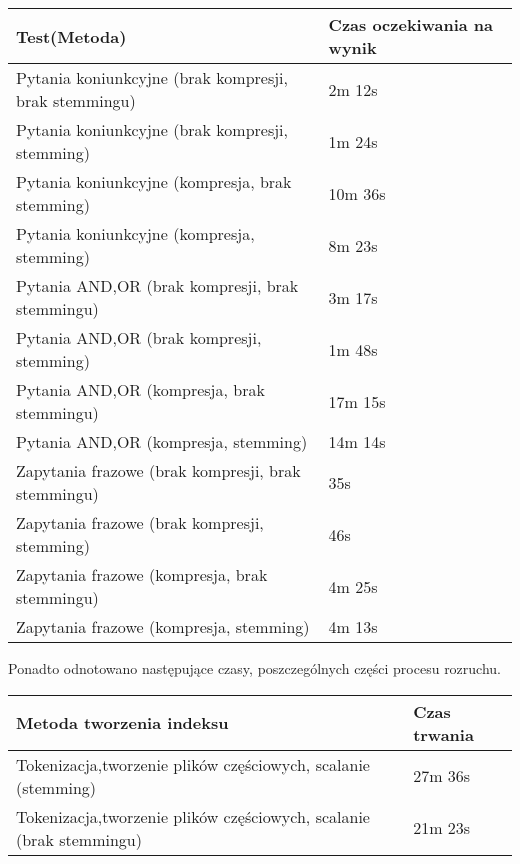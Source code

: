 \documentclass[11pt,leqno]{article}
\begin{document}
\begin{tabular}{|l|l|}
\hline
Test(Metoda) & Czas oczekiwania na wynik\\
\hline
Pytania koniunkcyjne (brak kompresji, brak stemmingu) & 2m 12s\\
Pytania koniunkcyjne (brak kompresji, stemming) & 1m 24s\\
Pytania koniunkcyjne (kompresja, brak stemming) & 10m 36s\\
Pytania koniunkcyjne (kompresja, stemming) &  8m 23s\\
Pytania AND,OR (brak kompresji, brak stemmingu) & 3m 17s\\
Pytania AND,OR (brak kompresji, stemming) & 1m 48s\\
Pytania AND,OR (kompresja, brak stemmingu) & 17m 15s\\
Pytania AND,OR (kompresja, stemming) & 14m 14s\\
Zapytania frazowe (brak kompresji, brak stemmingu) & 35s\\
Zapytania frazowe (brak kompresji, stemming) & 46s\\
Zapytania frazowe (kompresja, brak stemmingu) & 4m 25s\\
Zapytania frazowe (kompresja, stemming) & 4m 13s\\
\hline
\end{tabular}

Ponadto odnotowano następujące czasy, poszczególnych części procesu rozruchu.

\begin{tabular}{|l|l|}
\hline
Metoda tworzenia indeksu & Czas trwania\\
\hline
Tokenizacja,tworzenie plików częściowych, scalanie (stemming) & 27m 36s\\
Tokenizacja,tworzenie plików częściowych, scalanie (brak stemmingu) & 21m 23s\\
\hline

\end{tabular}
\end{document}
